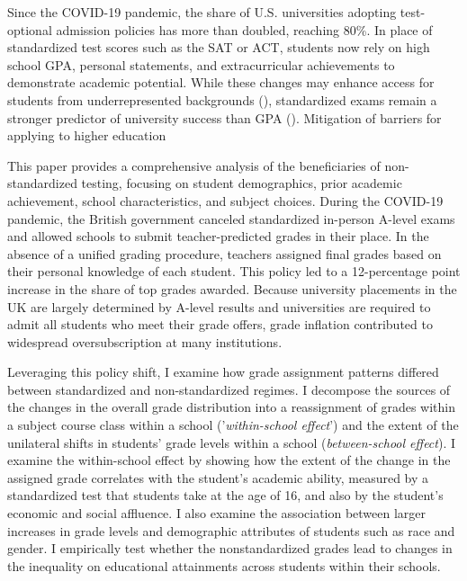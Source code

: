 Since the COVID-19 pandemic, the share of U.S. universities adopting test-optional admission policies has more than doubled, reaching 80\%. In place of standardized test scores such as the SAT or ACT, students now rely on high school GPA, personal statements, and extracurricular achievements to demonstrate academic potential. While these changes may enhance access for students from underrepresented backgrounds (\citet{Bennett2021}), standardized exams remain a stronger predictor of university success than GPA (\citet{Chetty2020}). Mitigation of barriers for applying to higher education 

This paper provides a comprehensive analysis of the beneficiaries of non-standardized testing, focusing on student demographics, prior academic achievement, school characteristics, and subject choices. During the COVID-19 pandemic, the British government canceled standardized in-person A-level exams and allowed schools to submit teacher-predicted grades in their place. In the absence of a unified grading procedure, teachers assigned final grades based on their personal knowledge of each student. This policy led to a 12-percentage point increase in the share of top grades awarded. Because university placements in the UK are largely determined by A-level results and universities are required to admit all students who meet their grade offers, grade inflation contributed to widespread oversubscription at many institutions.

Leveraging this policy shift, I examine how grade assignment patterns differed between standardized and non-standardized regimes. I decompose the sources of the changes in the overall grade distribution into a reassignment of grades within a subject course class within a school ('\emph{within-school effect}') and the extent of the unilateral shifts in students' grade levels within a school (\emph{between-school effect}). I examine the within-school effect by showing how the extent of the change in the assigned grade correlates with the student's academic ability, measured by a standardized test that students take at the age of 16, and also by the student's economic and social affluence. I also examine the association between larger increases in grade levels and demographic attributes of students such as race and gender. I empirically test whether the nonstandardized grades lead to changes in the inequality on educational attainments across students within their schools. 

